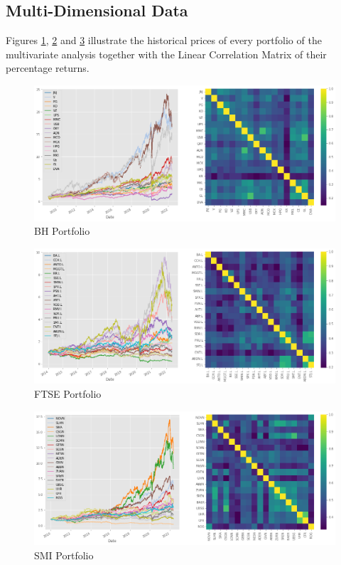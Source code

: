 \documentclass[a4paper, oneside]{discothesis}
\begin{document}
\subsection{Multi-Dimensional Data}\label{Multi_data}

Figures \ref{HB_P}, \ref{FTSE_P} and \ref{SMI_P} illustrate the historical prices of every portfolio of the multivariate analysis together with the Linear Correlation Matrix of their percentage returns.

\begin{figure}[H]
    \centering
    \includegraphics[width = 13cm]{figures/HB_data.png}
    \caption{BH Portfolio}
    \label{HB_P}
\end{figure}
\begin{figure}[H]
    \centering
    \includegraphics[width = 13cm]{figures/FTSE_data.png}
    \caption{FTSE Portfolio}
    \label{FTSE_P}
\end{figure}
\begin{figure}[H]
    \centering
    \includegraphics[width = 13cm]{figures/smi_data.png}
    \caption{SMI Portfolio}
    \label{SMI_P}
\end{figure}
\end{document}
